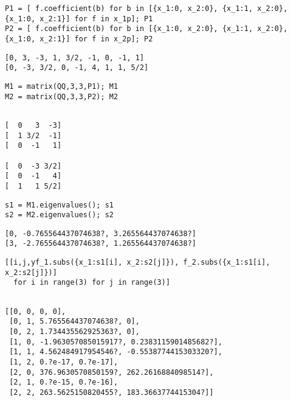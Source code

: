 \documentclass[dvipdfmx,11pat]{jarticle}
\begin{document}
\begin{verbatim}
P1 = [ f.coefficient(b) for b in [{x_1:0, x_2:0}, {x_1:1, x_2:0}, {x_1:0, x_2:1}] for f in x_1p]; P1
P2 = [ f.coefficient(b) for b in [{x_1:0, x_2:0}, {x_1:1, x_2:0}, {x_1:0, x_2:1}] for f in x_2p]; P2
\end{verbatim}


\label{org2f25d3a}
\begin{verbatim}
[0, 3, -3, 1, 3/2, -1, 0, -1, 1]
[0, -3, 3/2, 0, -1, 4, 1, 1, 5/2]
\end{verbatim}


\begin{verbatim}
M1 = matrix(QQ,3,3,P1); M1
M2 = matrix(QQ,3,3,P2); M2

\end{verbatim}

\label{org07ffe13}
\begin{verbatim}

[  0   3  -3]
[  1 3/2  -1]
[  0  -1   1]

[  0  -3 3/2]
[  0  -1   4]
[  1   1 5/2]
\end{verbatim}


\begin{verbatim}
s1 = M1.eigenvalues(); s1
s2 = M2.eigenvalues(); s2

\end{verbatim}

\label{org8804bd5}
\begin{verbatim}
[0, -0.765564437074638?, 3.265564437074638?]
[3, -2.765564437074638?, 1.265564437074638?]
\end{verbatim}


\begin{verbatim}
[[i,j,yf_1.subs({x_1:s1[i], x_2:s2[j]}), f_2.subs({x_1:s1[i], x_2:s2[j]})] 
  for i in range(3) for j in range(3)]
\end{verbatim}

\label{org1a93966}
\begin{verbatim}

[[0, 0, 0, 0],
 [0, 1, 5.765564437074638?, 0],
 [0, 2, 1.734435562925363?, 0],
 [1, 0, -1.963057085015917?, 0.2383115901485682?],
 [1, 1, 4.562484917954546?, -0.5538774415303320?],
 [1, 2, 0.?e-17, 0.?e-17],
 [2, 0, 376.9630570850159?, 262.2616884098514?],
 [2, 1, 0.?e-15, 0.?e-16],
 [2, 2, 263.5625150820455?, 183.3663774415304?]]
\end{verbatim}
\end{document}
